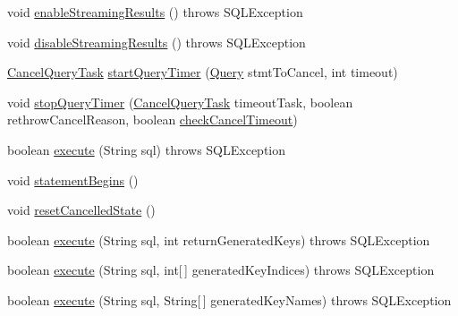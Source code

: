 \begin{DoxyCompactItemize}
\item 
void \mbox{\hyperlink{classcom_1_1mysql_1_1cj_1_1jdbc_1_1_statement_impl_a973ff5045e258a5c3e156887c116c976}{enable\+Streaming\+Results}} ()  throws S\+Q\+L\+Exception 
\item 
void \mbox{\hyperlink{classcom_1_1mysql_1_1cj_1_1jdbc_1_1_statement_impl_a9e5713d601e7e410e0edb1647b6f9160}{disable\+Streaming\+Results}} ()  throws S\+Q\+L\+Exception 
\item 
\mbox{\hyperlink{interfacecom_1_1mysql_1_1cj_1_1_cancel_query_task}{Cancel\+Query\+Task}} \mbox{\hyperlink{classcom_1_1mysql_1_1cj_1_1jdbc_1_1_statement_impl_a0f8e090e92e82672734e247c080f7da7}{start\+Query\+Timer}} (\mbox{\hyperlink{interfacecom_1_1mysql_1_1cj_1_1_query}{Query}} stmt\+To\+Cancel, int timeout)
\item 
void \mbox{\hyperlink{classcom_1_1mysql_1_1cj_1_1jdbc_1_1_statement_impl_a45e2d251ef9edf83345cde29d58dd704}{stop\+Query\+Timer}} (\mbox{\hyperlink{interfacecom_1_1mysql_1_1cj_1_1_cancel_query_task}{Cancel\+Query\+Task}} timeout\+Task, boolean rethrow\+Cancel\+Reason, boolean \mbox{\hyperlink{classcom_1_1mysql_1_1cj_1_1jdbc_1_1_statement_impl_a8409855892d4f4c55a35f3444f50825c}{check\+Cancel\+Timeout}})
\item 
boolean \mbox{\hyperlink{classcom_1_1mysql_1_1cj_1_1jdbc_1_1_statement_impl_a55932ba2147827cc8b76353c14332c1f}{execute}} (String sql)  throws S\+Q\+L\+Exception 
\item 
void \mbox{\hyperlink{classcom_1_1mysql_1_1cj_1_1jdbc_1_1_statement_impl_a51c8920bf35fc909ec12c2755ee2c491}{statement\+Begins}} ()
\item 
void \mbox{\hyperlink{classcom_1_1mysql_1_1cj_1_1jdbc_1_1_statement_impl_afca7737baacefddb5151fa0c81a20ee0}{reset\+Cancelled\+State}} ()
\item 
boolean \mbox{\hyperlink{classcom_1_1mysql_1_1cj_1_1jdbc_1_1_statement_impl_a3a037fac1a8f37129b0eab24203b73f9}{execute}} (String sql, int return\+Generated\+Keys)  throws S\+Q\+L\+Exception 
\item 
boolean \mbox{\hyperlink{classcom_1_1mysql_1_1cj_1_1jdbc_1_1_statement_impl_ae74dd4c72023e709b23c9ea71ca1678a}{execute}} (String sql, int\mbox{[}$\,$\mbox{]} generated\+Key\+Indices)  throws S\+Q\+L\+Exception 
\item 
boolean \mbox{\hyperlink{classcom_1_1mysql_1_1cj_1_1jdbc_1_1_statement_impl_a165371a7abd4d72d54a8ceaf0066aee1}{execute}} (String sql, String\mbox{[}$\,$\mbox{]} generated\+Key\+Names)  throws S\+Q\+L\+Exception 
\item 

\end{DoxyCompactItemize}
